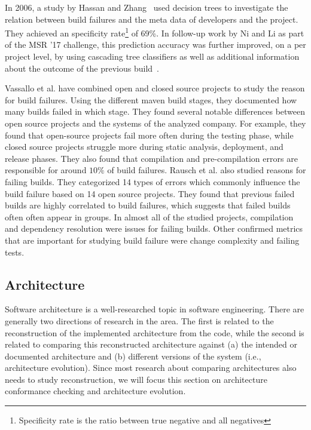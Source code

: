 \documentclass[sigconf, anonymous, review]{acmart}
\begin{document}
In 2006, a study by Hassan and Zhang~\cite{Pred-Tree} used decision trees to investigate the relation between build failures and the meta data of developers and the project.
They achieved an specificity rate\footnote{Specificity rate is the ratio between true negative and all negatives} of 69\%.
In follow-up work by Ni and Li as part of the MSR '17 challenge, this prediction accuracy was further improved, on a per project level, by using cascading tree classifiers as well as additional information about the outcome of the previous build~\cite{Pred-Cascade}. 

Vassallo et al. \cite{CIFailTypes} have combined open and closed source projects to study the reason for build failures. Using the different maven build stages, they documented how many builds failed in which stage. They found several notable differences between open source projects and the systems of the analyzed company. For example, they found that open-source projects fail more often during the testing phase, while closed source projects struggle more during static analysis, deployment, and release phases. They also found that compilation and pre-compilation errors are responsible for around $10\%$ of build failures.
Rausch et al. \cite{FailsinCIFlow} also studied reasons for failing builds. They categorized 14 types of errors which commonly influence the build failure based on 14 open source projects. They found that previous failed builds are highly correlated to build failures, which suggests that failed builds often often appear in groups. In almost all of the studied projects, compilation and dependency resolution were issues for failing builds. Other confirmed metrics that are important for studying build failure were change complexity and failing tests.

\subsection{Architecture}
\label{sec:relwork-arch}

Software architecture is a well-researched topic in software engineering.
There are generally two directions of research in the area.
The first is related to the reconstruction of the implemented architecture from the code, while the second is related to comparing this reconstructed architecture against (a) the intended or documented architecture and (b) different versions of the system (i.e., architecture evolution).
Since most research about comparing architectures also needs to study reconstruction, we will focus this section on architecture conformance checking and architecture evolution.
\end{document}
